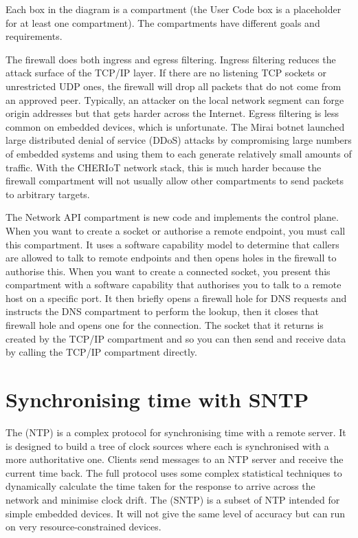 Each box in the diagram is a compartment (the User Code box is a placeholder for at least one compartment).
The compartments have different goals and requirements.

The firewall does both ingress and egress filtering.
Ingress filtering reduces the attack surface of the TCP/IP layer.
If there are no listening TCP sockets or unrestricted UDP ones, the firewall will drop all packets that do not come from an approved peer.
Typically, an attacker on the local network segment can forge origin addresses but that gets harder across the Internet.
Egress filtering is less common on embedded devices, which is unfortunate.
The Mirai botnet launched large distributed denial of service (DDoS) attacks by compromising large numbers of embedded systems and using them to each generate relatively small amounts of traffic.
With the CHERIoT network stack, this is much harder because the firewall compartment will not usually allow other compartments to send packets to arbitrary targets.

The Network API compartment is new code and implements the control plane.
When you want to create a socket or authorise a remote endpoint, you must call this compartment.
It uses a software capability model to determine that callers are allowed to talk to remote endpoints and then opens holes in the firewall to authorise this.
When you want to create a connected socket, you present this compartment with a software capability that authorises you to talk to a remote host on a specific port.
It then briefly opens a firewall hole for DNS requests and instructs the DNS compartment to perform the lookup, then it closes that firewall hole and opens one for the connection.
The socket that it returns is created by the TCP/IP compartment and so you can then send and receive data by calling the TCP/IP compartment directly.

\section{Synchronising time with SNTP}

The  (NTP) is a complex protocol for synchronising time with a remote server.
It is designed to build a tree of clock sources where each  is synchronised with a more authoritative one.
Clients send messages to an NTP server and receive the current time back.
The full protocol uses some complex statistical techniques to dynamically calculate the time taken for the response to arrive across the network and minimise clock drift.
The  (SNTP) is a subset of NTP intended for simple embedded devices.
It will not give the same level of accuracy but can run on very resource-constrained devices.


